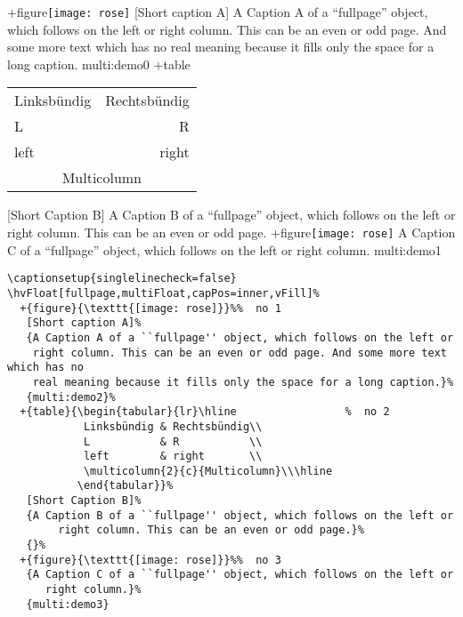 \documentclass[twoside]{scrartcl}
\begin{document}
\hvFloat[fullpage,multiFloat,capPos=inner,vFill]%
  +{figure}{\texttt{[image: rose]}}%
   [Short caption A]%
   {A Caption A of a ``fullpage'' object, which follows on the left or
    right column. This can be an even or odd page. And some more text which has no
    real meaning because it fills only the space for a long caption.}%
   {multi:demo0}%
  +{table}{\begin{tabular}{lr}\hline                 %
            Linksbündig & Rechtsbündig\\
            L           & R           \\
            left        & right       \\
            \multicolumn{2}{c}{Multicolumn}\\\hline
           \end{tabular}}%
   [Short Caption B]%
   {A Caption B of a ``fullpage'' object, which follows on the left or
        right column. This can be an even or odd page.}%
   {}%
  +{figure}{\texttt{[image: rose]}}%
   {A Caption C of a ``fullpage'' object, which follows on the left or
      right column.}%
   {multi:demo1}


\Blindtext
\Blindtext




\begin{lstlisting}
\captionsetup{singlelinecheck=false}
\hvFloat[fullpage,multiFloat,capPos=inner,vFill]%
  +{figure}{\texttt{[image: rose]}}%%  no 1
   [Short caption A]%
   {A Caption A of a ``fullpage'' object, which follows on the left or
    right column. This can be an even or odd page. And some more text which has no
    real meaning because it fills only the space for a long caption.}%
   {multi:demo2}%
  +{table}{\begin{tabular}{lr}\hline                 %  no 2
            Linksbündig & Rechtsbündig\\
            L           & R           \\
            left        & right       \\
            \multicolumn{2}{c}{Multicolumn}\\\hline
           \end{tabular}}%
   [Short Caption B]%
   {A Caption B of a ``fullpage'' object, which follows on the left or
        right column. This can be an even or odd page.}%
   {}%
  +{figure}{\texttt{[image: rose]}}%%  no 3
   {A Caption C of a ``fullpage'' object, which follows on the left or
      right column.}%
   {multi:demo3}
\end{lstlisting}
\end{document}
